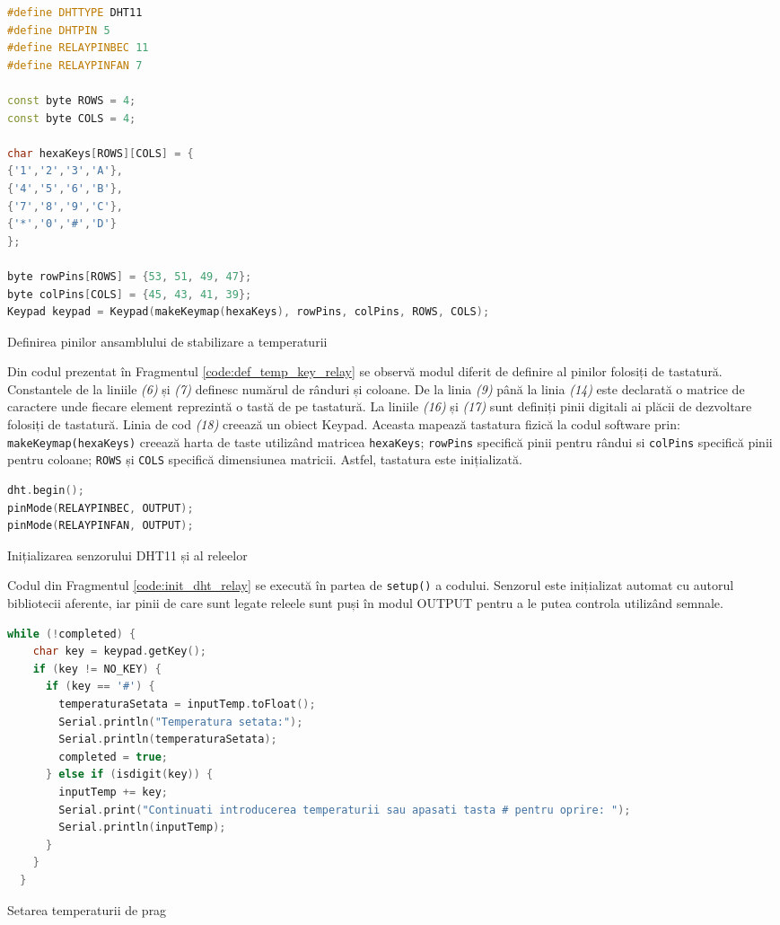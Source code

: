 \begin{code}[H]
\begin{lstlisting}[language=C++]
#define DHTTYPE DHT11
#define DHTPIN 5
#define RELAYPINBEC 11
#define RELAYPINFAN 7

const byte ROWS = 4;
const byte COLS = 4;

char hexaKeys[ROWS][COLS] = {
{'1','2','3','A'},
{'4','5','6','B'},
{'7','8','9','C'},
{'*','0','#','D'}
};

byte rowPins[ROWS] = {53, 51, 49, 47};
byte colPins[COLS] = {45, 43, 41, 39};
Keypad keypad = Keypad(makeKeymap(hexaKeys), rowPins, colPins, ROWS, COLS);
\end{lstlisting}
\caption{Definirea pinilor ansamblului de stabilizare a temperaturii}
\label{code:def_temp_key_relay}
\end{code}

Din codul prezentat în Fragmentul \ref{code:def_temp_key_relay} se observă modul diferit de definire al pinilor folosiți de tastatură. Constantele de la liniile \textit{(6)} și \textit{(7)} definesc numărul de rânduri și coloane. De la linia \textit{(9)} până la linia \textit{(14)} este declarată o matrice de caractere unde fiecare element reprezintă o tastă de pe tastatură. La liniile \textit{(16)} și \textit{(17)} sunt definiți pinii digitali ai plăcii de dezvoltare folosiți de tastatură. Linia de cod \textit{(18)} creează un obiect Keypad. Aceasta mapează tastatura fizică la codul software prin: \texttt{makeKeymap(hexaKeys)} creează harta de taste utilizând matricea \texttt{hexaKeys}; \texttt{rowPins} specifică pinii pentru rândui si \texttt{colPins} specifică pinii pentru coloane; \texttt{ROWS} și \texttt{COLS} specifică dimensiunea matricii. Astfel, tastatura este inițializată.

\begin{code}[H]
\begin{lstlisting}[language=C++]
dht.begin();
pinMode(RELAYPINBEC, OUTPUT);
pinMode(RELAYPINFAN, OUTPUT);
\end{lstlisting}
\caption{Inițializarea senzorului DHT11 și al releelor}
\label{code:init_dht_relay}
\end{code}

Codul din Fragmentul \ref{code:init_dht_relay} se execută în partea de \texttt{setup()} a codului. Senzorul este inițializat automat cu autorul bibliotecii aferente, iar pinii de care sunt legate releele sunt puși în modul OUTPUT pentru a le putea controla utilizând semnale.

\begin{code}[H]
\begin{lstlisting}[language=C++]
 while (!completed) {
    char key = keypad.getKey();
    if (key != NO_KEY) {
      if (key == '#') {
        temperaturaSetata = inputTemp.toFloat(); 
        Serial.println("Temperatura setata:");
        Serial.println(temperaturaSetata);
        completed = true; 
      } else if (isdigit(key)) {
        inputTemp += key;
        Serial.print("Continuati introducerea temperaturii sau apasati tasta # pentru oprire: ");
        Serial.println(inputTemp); 
      }
    }
  }
\end{lstlisting}
\caption{Setarea temperaturii de prag}
\label{code:set_temp}
\end{code}

